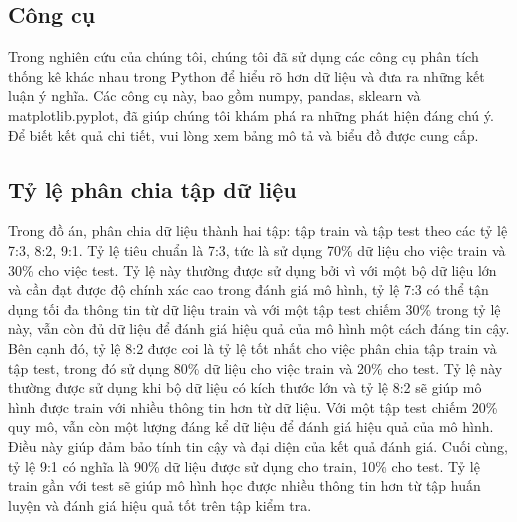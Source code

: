 \subsection{Công cụ}
Trong nghiên cứu của chúng tôi, chúng tôi đã sử dụng các công cụ phân tích thống kê khác nhau trong Python để hiểu rõ hơn dữ liệu và đưa ra những kết luận ý nghĩa. Các công cụ này, bao gồm numpy, pandas, sklearn và matplotlib.pyplot, đã giúp chúng tôi khám phá ra những phát hiện đáng chú ý. Để biết kết quả chi tiết, vui lòng xem bảng mô tả và biểu đồ được cung cấp.

\subsection{Tỷ lệ phân chia tập dữ liệu}
Trong đồ án, phân chia dữ liệu thành hai tập: tập train và tập test theo các tỷ lệ 7:3, 8:2, 9:1. Tỷ lệ tiêu chuẩn là 7:3, tức là sử dụng 70\% dữ liệu cho việc train và 30\% cho việc test. Tỷ lệ này thường được sử dụng bởi vì với một bộ dữ liệu lớn và cần đạt được độ chính xác cao trong đánh giá mô hình, tỷ lệ 7:3 có thể tận dụng tối đa thông tin từ dữ liệu train và với một tập test chiếm 30\% trong tỷ lệ này, vẫn còn đủ dữ liệu để đánh giá hiệu quả của mô hình một cách đáng tin cậy. Bên cạnh đó, tỷ lệ 8:2 được coi là tỷ lệ tốt nhất cho việc phân chia tập train và tập test, trong đó sử dụng 80\% dữ liệu cho việc train và 20\% cho test. Tỷ lệ này thường được sử dụng khi bộ dữ liệu có kích thước lớn và tỷ lệ 8:2 sẽ giúp mô hình được train với nhiều thông tin hơn từ dữ liệu. Với một tập test chiếm 20\% quy mô, vẫn còn một lượng đáng kể dữ liệu để đánh giá hiệu quả của mô hình. Điều này giúp đảm bảo tính tin cậy và đại diện của kết quả đánh giá. Cuối cùng, tỷ lệ 9:1 có nghĩa là 90\% dữ liệu được sử dụng cho train, 10\% cho test. Tỷ lệ train gần với test sẽ giúp mô hình học được nhiều thông tin hơn từ tập huấn luyện và đánh giá hiệu quả tốt trên tập kiểm tra.

